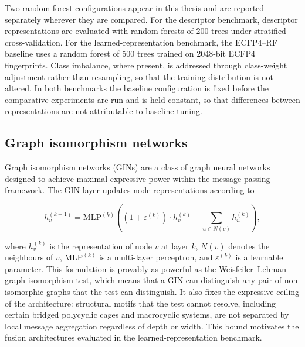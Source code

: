 Two random-forest configurations appear in this thesis and are reported separately wherever they are compared. For the descriptor benchmark, descriptor representations are evaluated with random forests of \num{200} trees under stratified cross-validation. For the learned-representation benchmark, the ECFP4--RF baseline uses a random forest of \num{500} trees trained on \num{2048}-bit ECFP4 fingerprints. Class imbalance, where present, is addressed through class-weight adjustment rather than resampling, so that the training distribution is not altered. In both benchmarks the baseline configuration is fixed before the comparative experiments are run and is held constant, so that differences between representations are not attributable to baseline tuning.

\subsection{Graph isomorphism networks}

Graph isomorphism networks (GINs) are a class of graph neural networks designed to achieve maximal expressive power within the message-passing framework. The GIN layer updates node representations according to

\begin{equation}
h_{v}^{(k+1)} = \mathrm{MLP}^{(k)} \left( (1 + \varepsilon^{(k)}) \cdot h_{v}^{(k)} + \sum_{u \in N(v)} h_{u}^{(k)} \right),
\end{equation}

where $h_{v}^{(k)}$ is the representation of node $v$ at layer $k$, $N(v)$ denotes the neighbours of $v$, $\mathrm{MLP}^{(k)}$ is a multi-layer perceptron, and $\varepsilon^{(k)}$ is a learnable parameter. This formulation is provably as powerful as the Weisfeiler--Lehman graph isomorphism test, which means that a GIN can distinguish any pair of non-isomorphic graphs that the test can distinguish\cite{Xu2019}. It also fixes the expressive ceiling of the architecture: structural motifs that the test cannot resolve, including certain bridged polycyclic cages and macrocyclic systems, are not separated by local message aggregation regardless of depth or width. This bound motivates the fusion architectures evaluated in the learned-representation benchmark.

